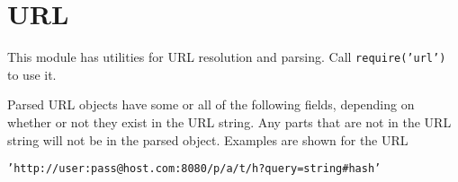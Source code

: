 \section{URL}

\begin{Shaded}
\begin{Highlighting}[]
\NormalTok{: } 
\end{Highlighting}
\end{Shaded}

This module has utilities for URL resolution and parsing. Call
\texttt{require('url')} to use it.

Parsed URL objects have some or all of the following fields, depending
on whether or not they exist in the URL string. Any parts that are not
in the URL string will not be in the parsed object. Examples are shown
for the URL

\texttt{'http://user:pass@host.com:8080/p/a/t/h?query=string\#hash'}

